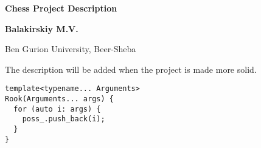 \documentclass[12pt, english]{article}
\begin{document}
\hoffset=0cm \voffset=0cm \textwidth=345pt \textheight=598pt

\begin{titlepage}

\begin{center}


\vspace*{1cm}
            
            \Huge
            \textbf{Chess Project Description}
            
            \vspace{0.5cm}
            \LARGE
            
            \vspace{1.5cm}
            
            \textbf{Balakirskiy M.V.}
           
            \vfill

\vspace{0.8cm} Ben Gurion University, Beer-Sheba\\

\end{center}

\end{titlepage}

\hoffset=-2cm \voffset=-2.5cm \textwidth=17cm \textheight=23cm

The description will be added when the project is made more solid.\\
\begin{lstlisting}[caption={Just testing}]
template<typename... Arguments>
Rook(Arguments... args) {
  for (auto i: args) {
    poss_.push_back(i);
  }
}
\end{lstlisting}
\end{document}
